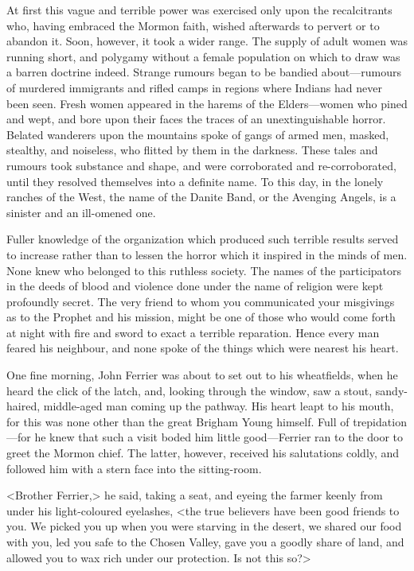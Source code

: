At first this vague and terrible power was exercised only upon the recalcitrants who, having embraced the Mormon faith, wished afterwards to pervert or to abandon it. Soon, however, it took a wider range. The supply of adult women was running short, and polygamy without a female population on which to draw was a barren doctrine indeed. Strange rumours began to be bandied about—rumours of murdered immigrants and rifled camps in regions where Indians had never been seen. Fresh women appeared in the harems of the Elders—women who pined and wept, and bore upon their faces the traces of an unextinguishable horror. Belated wanderers upon the mountains spoke of gangs of armed men, masked, stealthy, and noiseless, who flitted by them in the darkness. These tales and rumours took substance and shape, and were corroborated and re-corroborated, until they resolved themselves into a definite name. To this day, in the lonely ranches of the West, the name of the Danite Band, or the Avenging Angels, is a sinister and an ill-omened one.

Fuller knowledge of the organization which produced such terrible results served to increase rather than to lessen the horror which it inspired in the minds of men. None knew who belonged to this ruthless society. The names of the participators in the deeds of blood and violence done under the name of religion were kept profoundly secret. The very friend to whom you communicated your misgivings as to the Prophet and his mission, might be one of those who would come forth at night with fire and sword to exact a terrible reparation. Hence every man feared his neighbour, and none spoke of the things which were nearest his heart.

One fine morning, John Ferrier was about to set out to his wheatfields, when he heard the click of the latch, and, looking through the window, saw a stout, sandy-haired, middle-aged man coming up the pathway. His heart leapt to his mouth, for this was none other than the great Brigham Young himself. Full of trepidation—for he knew that such a visit boded him little good—Ferrier ran to the door to greet the Mormon chief. The latter, however, received his salutations coldly, and followed him with a stern face into the sitting-room.

<Brother Ferrier,> he said, taking a seat, and eyeing the farmer keenly from under his light-coloured eyelashes, <the true believers have been good friends to you. We picked you up when you were starving in the desert, we shared our food with you, led you safe to the Chosen Valley, gave you a goodly share of land, and allowed you to wax rich under our protection. Is not this so?>

